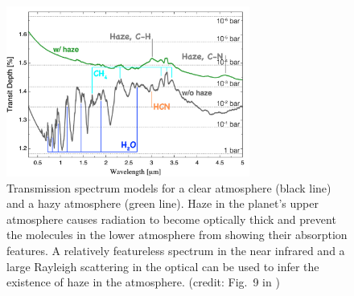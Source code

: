 \begin{figure}
\centering
\includegraphics[width=8cm]{figures/haze_kawashima2017.jpg}
\caption{Transmission spectrum models for a clear atmosphere (black line) and  a hazy atmosphere (green line). Haze in the planet's upper atmosphere causes radiation to become optically thick and prevent the molecules in the lower atmosphere from showing their absorption features. A relatively featureless spectrum in the near infrared and a large Rayleigh scattering in the optical can be used to infer the existence of haze in the atmosphere. (credit: Fig.~9 in \cite{Kawashima2017})}
\label{fig:atm_haze}
\end{figure}



